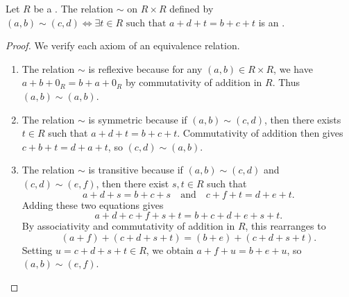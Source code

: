 \begin{proposition} \label{proposition:grothendieck_ring_equivalence_relation}
Let $R$ be a . The relation $\sim$ on $R \times R$ defined by $(a,b) \sim (c,d) \iff \exists t \in R \text{ such that } a + d + t = b + c + t$ is an .
\end{proposition}

\begin{proof}
We verify each axiom of an equivalence relation.

\begin{enumerate}
    \item The relation $\sim$ is reflexive because for any $(a,b) \in R \times R$, we have $a + b + 0_R = b + a + 0_R$ by commutativity of addition in $R$. Thus $(a,b) \sim (a,b)$.

    \item The relation $\sim$ is symmetric because if $(a,b) \sim (c,d)$, then there exists $t \in R$ such that $a + d + t = b + c + t$. Commutativity of addition then gives $c + b + t = d + a + t$, so $(c,d) \sim (a,b)$.

    \item The relation $\sim$ is transitive because if $(a,b) \sim (c,d)$ and $(c,d) \sim (e,f)$, then there exist $s, t \in R$ such that
    $$a + d + s = b + c + s \quad\text{and}\quad c + f + t = d + e + t.$$
    Adding these two equations gives
    $$a + d + c + f + s + t = b + c + d + e + s + t.$$
    By associativity and commutativity of addition in $R$, this rearranges to
    $$(a + f) + (c + d + s + t) = (b + e) + (c + d + s + t).$$
    Setting $u = c + d + s + t \in R$, we obtain $a + f + u = b + e + u$, so $(a,b) \sim (e,f)$.
\end{enumerate}
\end{proof}